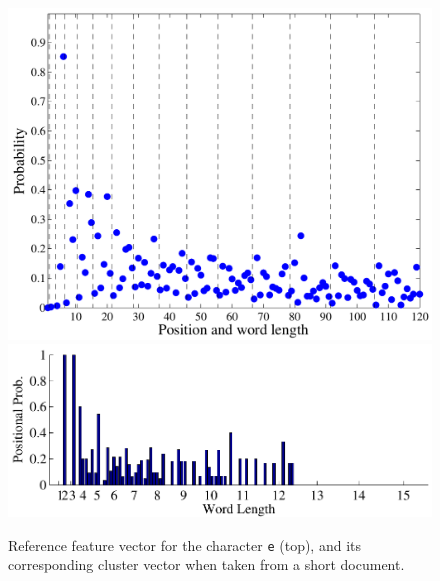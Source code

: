 \documentclass[times, 10pt,twocolumn]{article}
\begin{document}
\begin{figure}[ht]
  \centering
  \includegraphics[scale=.5]{figures/e_pos_feature}
  \includegraphics[scale=.5]{figures/e_pos_feature_clust}
  \caption{Reference feature vector for the character {\tt e} (top),
           and its corresponding cluster vector when taken from a short
           document. }
  \label{e_pos_fig}
\end{figure}
\end{document}
